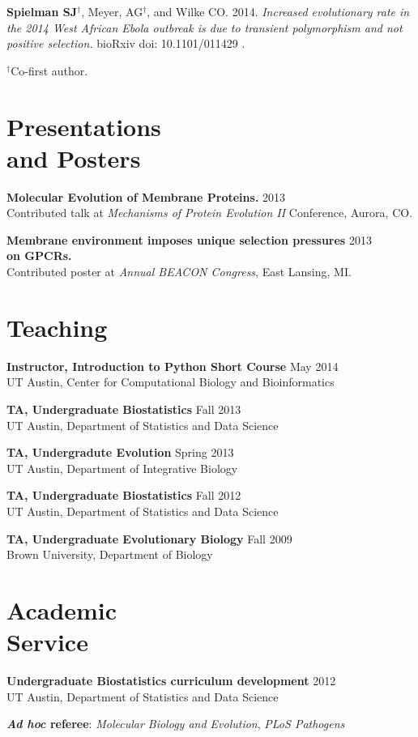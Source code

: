\documentclass[line, margin]{res}
\begin{document}
\begin{resume}
 \textbf{Spielman SJ}$^\dagger$, Meyer, AG$^\dagger$, and Wilke CO. 2014. \emph{Increased evolutionary rate in the 2014 West African Ebola outbreak is due to transient polymorphism and not positive selection.} bioRxiv doi: 10.1101/011429 .
 
$^\dagger$Co-first author.

\vspace{0.75cm}


\section{Presentations \\ and Posters}

\textbf{Molecular Evolution of Membrane Proteins.} \hfill 2013 \\ Contributed talk at \emph{Mechanisms of Protein Evolution II} Conference, Aurora, CO.

\textbf{Membrane environment imposes unique selection pressures} \hfill 2013 \\ \textbf{on GPCRs.} \\ Contributed poster at \emph{Annual BEACON Congress}, East Lansing, MI.

\vspace{0.75cm}


\section{Teaching} 

\textbf{Instructor, Introduction to Python Short Course} \hfill May 2014 \\ UT Austin, Center for Computational Biology and Bioinformatics

\textbf{TA, Undergraduate Biostatistics} \hfill Fall 2013 \\ UT Austin, Department of Statistics and Data Science

\textbf{TA, Undergradute Evolution} \hfill Spring 2013 \\ UT Austin, Department of Integrative Biology

\textbf{TA, Undergraduate Biostatistics} \hfill Fall 2012 \\ UT Austin, Department of 
Statistics and Data Science

\textbf{TA, Undergraduate Evolutionary Biology} \hfill Fall 2009 \\ Brown University, Department of Biology 

\vspace{0.75cm}

\section{Academic \\ Service} 

\textbf{Undergraduate Biostatistics curriculum development} \hfill 2012 \\UT Austin, Department of Statistics and Data Science

\textbf{\textit{Ad hoc} referee}: \textit{Molecular Biology and Evolution}, \textit{PLoS Pathogens} 

\end{resume}
\end{document}
